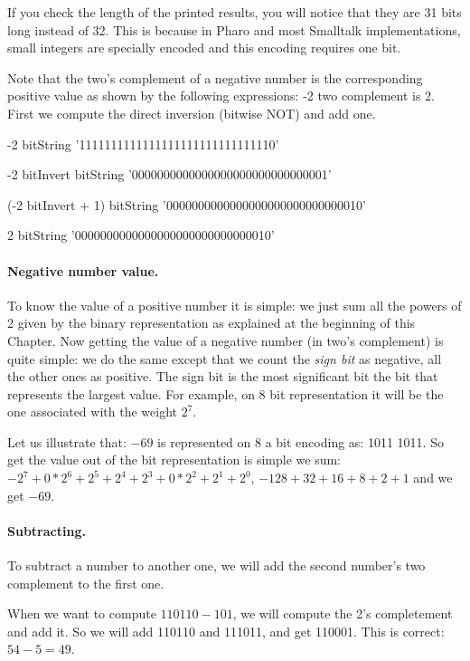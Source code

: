 \documentclass[a4paper,10pt,twoside]{book}
\begin{document}
If you check the length of the printed results, you will notice that they are 31 bits long instead of 32. This is because in Pharo and most Smalltalk implementations, small integers are specially encoded and this encoding requires one bit.

Note that the two's complement of a negative number is the corresponding positive value as shown by the following expressions: -2 two complement is 2. First we compute the direct inversion (bitwise NOT) and add one. 

\begin{code}{}
-2 bitString 
	'1111111111111111111111111111110'
	
-2 bitInvert bitString  
	'0000000000000000000000000000001'
	
(-2 bitInvert + 1) bitString   
	'0000000000000000000000000000010'

2 bitString 
	'0000000000000000000000000000010'
\end{code}

\paragraph{Negative number value.}
To know the value of a positive number it is simple: we just sum all the powers of 2 given by the binary representation as explained at the beginning of this Chapter. Now getting the value of a negative number (in two's complement) is quite simple: we do the same except that we count the \emph{sign bit} as negative, all the other ones as positive. The sign bit is the most significant bit \ie the bit that represents the largest value. For example, on 8 bit representation it will be the one associated with the weight $2^{7}$.

Let us illustrate that: 
$-69$ is represented on 8 a bit encoding as: 1011 1011. So get the value out of the bit representation is simple we sum: $-2^7 + 0*2^6 + 2^5 + 2^4 + 2^3 + 0*2^2 + 2^1 + 2^0$, \ie $-128 + 32 + 16 + 8 + 2 + 1$ and we get $-69$. 


\paragraph{Subtracting.}
To subtract a number to another one, we will add the second number's two complement to the first one.

When we want to compute $110110 - 101$, we will compute the 2's completement and add it. 
So we will add 110110 and 111011, and get 110001. This is correct: $54 - 5 = 49$.
\end{document}
